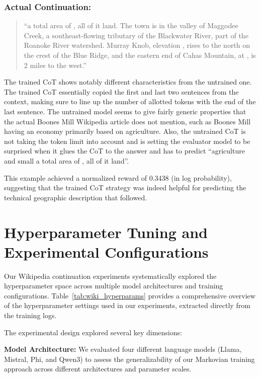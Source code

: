 \documentclass{article} %
\begin{document}
\subsubsection{Actual Continuation:}
\begin{quote}
``a total area of , all of it land. The town is in the valley of Maggodee Creek, a southeast-flowing tributary of the Blackwater River, part of the Roanoke River watershed. Murray Knob, elevation , rises  to the north on the crest of the Blue Ridge, and the eastern end of Cahas Mountain, at , is 2 miles to the west.''
\end{quote}

The trained CoT shows notably different characteristics from the untrained one. The trained CoT essentially copied the first and last two sentences from the context, making sure to line up the number of allotted tokens with the end of the last sentence. The untrained model seems to give fairly generic properties that the actual Boones Mill Wikipedia article does not mention, such as Boones Mill having an economy primarily based on agriculture. Also, the untrained CoT is not taking the token limit into account and is setting the evaluator model to be surprised when it glues the CoT to the answer and has to predict ``agriculture and small a total area of , all of it land''.

This example achieved a normalized reward of 0.3438 (in log probability), suggesting that the trained CoT strategy was indeed helpful for predicting the technical geographic description that followed.

\section{Hyperparameter Tuning and Experimental Configurations}
\label{sec:hyperparameters}

Our Wikipedia continuation experiments systematically explored the hyperparameter space across multiple model architectures and training configurations. Table~\ref{tab:wiki_hyperparams} provides a comprehensive overview of the hyperparameter settings used in our experiments, extracted directly from the training logs.

The experimental design explored several key dimensions:

\textbf{Model Architecture:} We evaluated four different language models (Llama, Mistral, Phi, and Qwen3) to assess the generalizability of our Markovian training approach across different architectures and parameter scales.
\end{document}

